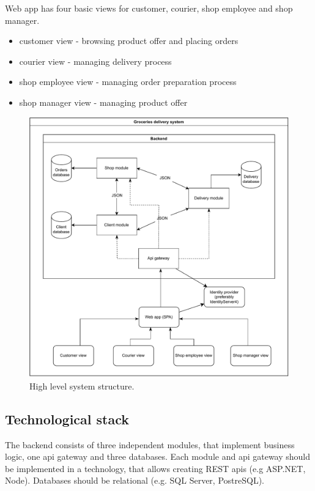 \documentclass[../main.tex]{subfiles}
\begin{document}
Web app has four basic views for customer, courier, shop employee and shop manager. 
\begin{itemize}
    \item customer view - browsing product offer and placing orders
    \item courier view - managing delivery process
    \item shop employee view - managing order preparation process
    \item shop manager view - managing product offer
\end{itemize}


\newpage

\begin{figure}[h!]
\caption{High level system structure.}
\vspace{5mm}
\centering
\includegraphics[width=\textwidth]
{diagrams/architecture.pdf}
\end{figure}

\subsection{Technological stack}

The backend consists of three independent modules, that implement business logic, one api gateway and three databases. Each module and api gateway should be implemented in a technology, that allows creating REST apis (e.g ASP.NET, Node). Databases should be relational (e.g. SQL Server, PostreSQL).
\end{document}
